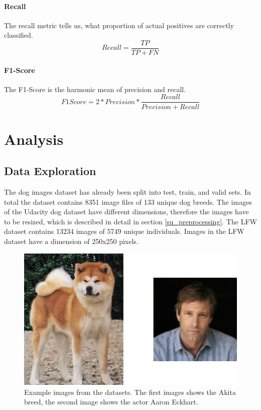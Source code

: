 \documentclass{article}
\begin{document}
\paragraph{Recall} The recall metric tells us, what proportion of actual positives are correctly classified.
\begin{equation}
Recall = \frac{TP}{TP + FN}
\end{equation}

\paragraph{F1-Score} The F1-Score is the harmonic mean of precision and recall.
\begin{equation}
F1 Score = 2 * Precision * \frac{Recall}{Precision + Recall}
\end{equation}

\section{Analysis} \label{s_analysis}

\subsection{Data Exploration} \label{su_data_expl}
The dog images dataset has already been split into test, train, and valid sets. In total the dataset contains 8351 image files of 133 unique dog breeds. The images of the Udacity dog dataset have different dimensions, therefore the images have to be resized, which is described in detail in section \ref{su_preprocessing}. The LFW dataset contains 13234 images of 5749 unique individuals. Images in the LFW dataset have a dimension of 250x250 pixels.

\begin{figure}[h]
    \centering
    \includegraphics[scale=0.35]{./images/dataset_example}
    \caption{Example images from the datasets. The first images shows the Akita breed, the second image shows the actor Aaron Eckhart.}
    \label{fig:dataset_example}
\end{figure}
\end{document}
